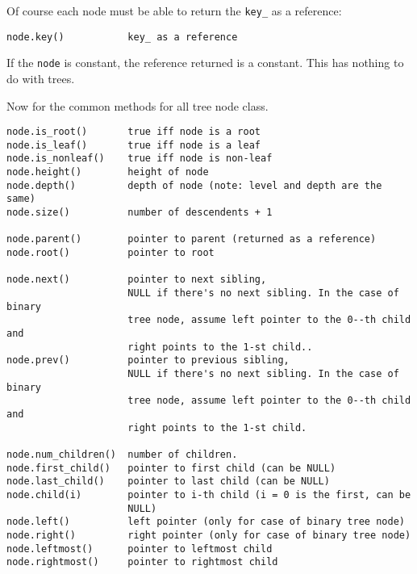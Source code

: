 Of course each node must be able to return the \verb!key_! as a reference:
\begin{Verbatim}[frame=single,fontsize=\footnotesize]
node.key()           key_ as a reference 
\end{Verbatim}
If the \texttt{node} is constant, the reference returned is a constant.
This has nothing to do with trees.


Now for the common methods for all tree node class.
\begin{Verbatim}[frame=single,fontsize=\footnotesize]
node.is_root()       true iff node is a root
node.is_leaf()       true iff node is a leaf
node.is_nonleaf()    true iff node is non-leaf
node.height()        height of node
node.depth()         depth of node (note: level and depth are the same)
node.size()          number of descendents + 1

node.parent()        pointer to parent (returned as a reference)
node.root()          pointer to root

node.next()          pointer to next sibling, 
                     NULL if there's no next sibling. In the case of binary 
                     tree node, assume left pointer to the 0--th child and 
                     right points to the 1-st child..
node.prev()          pointer to previous sibling,
                     NULL if there's no next sibling. In the case of binary 
                     tree node, assume left pointer to the 0--th child and 
                     right points to the 1-st child.

node.num_children()  number of children.
node.first_child()   pointer to first child (can be NULL)
node.last_child()    pointer to last child (can be NULL)
node.child(i)        pointer to i-th child (i = 0 is the first, can be 
                     NULL)
node.left()          left pointer (only for case of binary tree node)
node.right()         right pointer (only for case of binary tree node)
node.leftmost()      pointer to leftmost child
node.rightmost()     pointer to rightmost child


\end{Verbatim}
